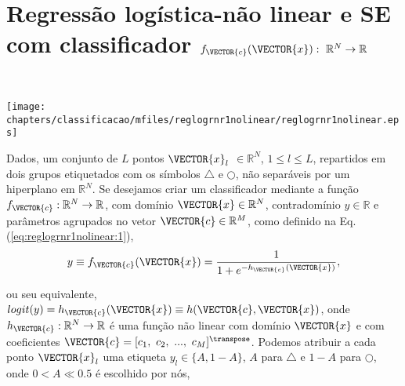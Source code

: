 \newpage

\section{Regressão logística-não linear e SE com classificador $f_{\VECTOR{c}}(\VECTOR{x}):~\mathbb{R}^{N} \rightarrow \mathbb{R}$}
\label{sec:theo:reglogrnr1nolinear:1}


\begin{theorem}\label{theo:reglogrnr1nolinear:1}
~\\
\noindent
\begin{minipage}{0.45\textwidth}
\centering
\texttt{[image: chapters/classificacao/mfiles/reglogrnr1nolinear/reglogrnr1nolinear.eps]} 
\end{minipage}
\begin{minipage}{0.55\textwidth}
Dados, um conjunto de $L$ pontos
$\VECTOR{x}_l$ $\in \mathbb{R}^{N}$, $1\leq l \leq L$,
repartidos em dois grupos etiquetados com os símbolos $\bigtriangleup$ e $\bigcirc$,
não separáveis por um hiperplano  em $\mathbb{R}^{N}$.
Se desejamos criar um classificador mediante 
a função  $f_{\VECTOR{c}}:\mathbb{R}^{N} \rightarrow \mathbb{R}$,
com domínio $\VECTOR{x} \in \mathbb{R}^{N}$, contradomínio $y \in \mathbb{R}$ e 
parâmetros agrupados no vetor $\VECTOR{c} \in \mathbb{R}^{M}$,
como definido na Eq. (\ref{eq:reglogrnr1nolinear:1}),
\begin{equation}\label{eq:reglogrnr1nolinear:1}
y\equiv f_{\VECTOR{c}}(\VECTOR{x})= \frac{1}{1+e^{-h_{\VECTOR{c}}(\VECTOR{x})}},
\end{equation}
\end{minipage}
ou seu equivalente, $logit(y)=h_{\VECTOR{c}}(\VECTOR{x})\equiv h(\VECTOR{c},\VECTOR{x})$,
onde $h_{\VECTOR{c}}: \mathbb{R}^{N} \rightarrow \mathbb{R}$ é uma função não linear
com domínio $\VECTOR{x}$ e
com coeficientes $\VECTOR{c}=[c_1,~c_2,~...,~c_M]^{\transpose}$.
Podemos atribuir a cada ponto $\VECTOR{x}_l$ uma etiqueta $y_l\in \{A,1-A\}$, 
$A$ para $\bigtriangleup$ e  $1-A$ para $\bigcirc$,
onde $0<A\ll 0.5$ é escolhido por nós,

\end{theorem}
